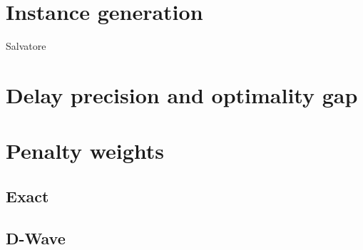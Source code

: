 \documentclass[twocolumn]{article}
\begin{document}
\section{Instance generation}
Salvatore

\section{Delay precision and optimality gap}


\section{Penalty weights} 

\subsection{Exact}

\subsection{D-Wave}
\end{document}
